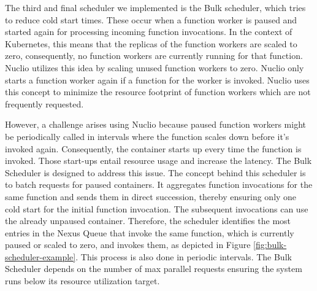 The third and final scheduler we implemented is the Bulk scheduler, which tries to reduce cold start times. These occur when a function worker is paused and started again for processing incoming function invocations. In the context of Kubernetes, this means that the replicas of the function workers are scaled to zero, consequently, no function workers are currently running for that function. Nuclio utilizes this idea by scaling unused function workers to zero. Nuclio only starts a function worker again if a function for the worker is invoked. Nuclio uses this concept to minimize the resource footprint of function workers which are not frequently requested.

However, a challenge arises using Nuclio because paused function workers might be periodically called in intervals where the function scales down before it's invoked again. Consequently, the container starts up every time the function is invoked. Those start-ups entail resource usage and increase the latency. The Bulk Scheduler is designed to address this issue. The concept behind this scheduler is to batch requests for paused containers. It aggregates function invocations for the same function and sends them in direct succession, thereby ensuring only one cold start for the initial function invocation. The subsequent invocations can use the already unpaused container. Therefore, the scheduler identifies the most entries in the Nexus Queue that invoke the same function, which is currently paused or scaled to zero, and invokes them, as depicted in Figure \ref{fig:bulk-scheduler-example}. This process is also done in periodic intervals. The Bulk Scheduler depends on the number of max parallel requests ensuring the system runs below its resource utilization target.
